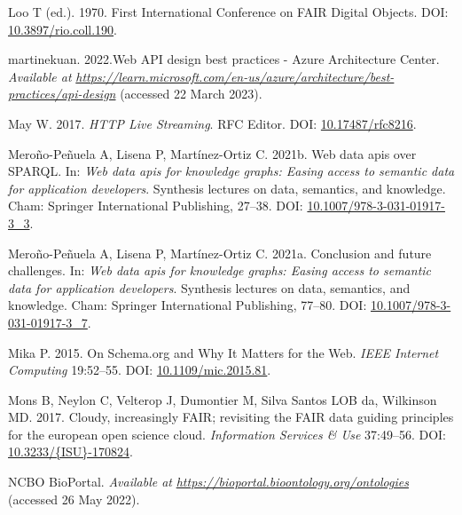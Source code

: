 \begin{CSLReferences}{1}{0}
\leavevmode{}%
Loo T (ed.). 1970. First International Conference on FAIR Digital Objects. DOI: \href{https://doi.org/10.3897/rio.coll.190}{10.3897/rio.coll.190}.

\leavevmode{}%
martinekuan. 2022.Web API design best practices - Azure Architecture Center. \emph{Available at} \href{https://learn.microsoft.com/en-us/azure/architecture/best-practices/api-design}{\emph{https://learn.microsoft.com/en-us/azure/architecture/best-practices/api-design}} (accessed 22 March 2023).

\leavevmode{}%
May W. 2017. \emph{HTTP Live Streaming}. RFC Editor. DOI: \href{https://doi.org/10.17487/rfc8216}{10.17487/rfc8216}.

\leavevmode{}%
Meroño-Peñuela A, Lisena P, Martínez-Ortiz C. 2021b. Web data apis over SPARQL. In: \emph{Web data apis for knowledge graphs: Easing access to semantic data for application developers}. Synthesis lectures on data, semantics, and knowledge. Cham: Springer International Publishing, 27--38. DOI: \href{https://doi.org/10.1007/978-3-031-01917-3_3}{10.1007/978-3-031-01917-3\_3}.

\leavevmode{}%
Meroño-Peñuela A, Lisena P, Martínez-Ortiz C. 2021a. Conclusion and future challenges. In: \emph{Web data apis for knowledge graphs: Easing access to semantic data for application developers}. Synthesis lectures on data, semantics, and knowledge. Cham: Springer International Publishing, 77--80. DOI: \href{https://doi.org/10.1007/978-3-031-01917-3_7}{10.1007/978-3-031-01917-3\_7}.

\leavevmode{}%
Mika P. 2015. On Schema.org and Why It Matters for the Web. \emph{IEEE Internet Computing} 19:52--55. DOI: \href{https://doi.org/10.1109/mic.2015.81}{10.1109/mic.2015.81}.

\leavevmode{}%
Mons B, Neylon C, Velterop J, Dumontier M, Silva Santos LOB da, Wilkinson MD. 2017. Cloudy, increasingly FAIR; revisiting the FAIR data guiding principles for the european open science cloud. \emph{Information Services \& Use} 37:49--56. DOI: \href{https://doi.org/10.3233/\%7BISU\%7D-170824}{10.3233/\{ISU\}-170824}.

\leavevmode{}%
NCBO BioPortal. \emph{Available at} \href{https://bioportal.bioontology.org/ontologies}{\emph{https://bioportal.bioontology.org/ontologies}} (accessed 26 May 2022).


\end{CSLReferences}
